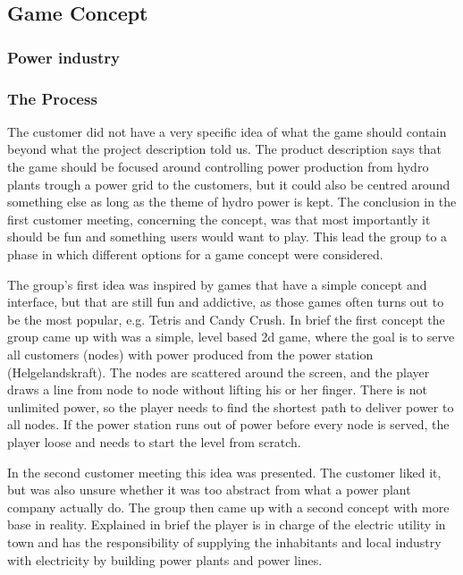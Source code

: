 \subsection{Game Concept}

\subsubsection{Power industry} %

\subsubsection{The Process}

The customer did not have a very specific idea of what the game should contain
beyond what the project description told us. The product description says
that the game should be focused around controlling power production from
hydro plants trough a power grid to the customers, but it could also be
centred around something else as long as the theme of hydro power is kept. The
conclusion in the first customer meeting, concerning the concept, was that
most importantly it should be fun and something users would want to play. This
lead the group to a phase in which different options for a game concept were
considered.

The group's first idea was inspired by games that have a simple concept and
interface, but that are still fun and addictive, as those games often turns out
to be the most popular, e.g. Tetris and Candy Crush. In brief the first concept
the group came up with was a simple, level based 2d game, where the goal is
to serve all customers (nodes) with power produced from the power station
(Helgelandskraft). The nodes are scattered around the screen, and the player
draws a line from node to node without lifting his or her finger. There is
not unlimited power, so the player needs to find the shortest path to deliver
power to all nodes. If the power station runs out of power before every node is
served, the player loose and needs to start the level from scratch.

In the second customer meeting this idea was presented. The customer liked it,
but was also unsure whether it was too abstract from what a power plant company
actually do. The group then came up with a second concept with more base in
reality. Explained in brief the player is in charge of the electric utility in
town and has the responsibility of supplying the inhabitants and local industry
with electricity by building power plants and power lines.

